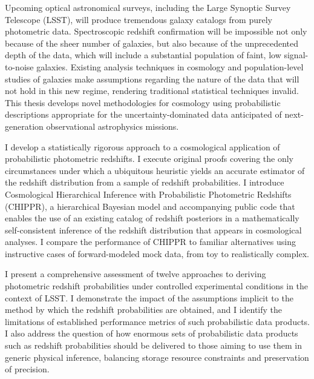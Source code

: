Upcoming optical astronomical surveys, including the Large Synoptic Survey Telescope (LSST), will produce tremendous galaxy catalogs from purely photometric data.
Spectroscopic redshift confirmation will be impossible not only because of the sheer number of galaxies, but also because of the unprecedented depth of the data, which will include a substantial population of faint, low signal-to-noise galaxies.
Existing analysis techniques in cosmology and population-level studies of galaxies make assumptions regarding the nature of the data that will not hold in this new regime, rendering traditional statistical techniques invalid.
This thesis develops novel methodologies for cosmology using probabilistic descriptions appropriate for the uncertainty-dominated data anticipated of next-generation observational astrophysics missions. 

I develop a statistically rigorous approach to a cosmological application of probabilistic photometric redshifts.
I execute original proofs covering the only circumstances under which a ubiquitous heuristic yields an accurate estimator of the redshift distribution from a sample of redshift probabilities.
I introduce Cosmological Hierarchical Inference with Probabilistic Photometric Redshifts (CHIPPR), a hierarchical Bayesian model and accompanying public code that enables the use of an existing catalog of redshift posteriors in a mathematically self-consistent inference of the redshift distribution that appears in cosmological analyses.
I compare the performance of CHIPPR to familiar alternatives using instructive cases of forward-modeled mock data, from toy to realistically complex.

I present a comprehensive assessment of twelve approaches to deriving photometric redshift probabilities under controlled experimental conditions in the context of LSST.
I demonstrate the impact of the assumptions implicit to the method by which the redshift probabilities are obtained, and I identify the limitations of established performance metrics of such probabilistic data products.
I also address the question of how enormous sets of probabilistic data products such as redshift probabilities should be delivered to those aiming to use them in generic physical inference, balancing storage resource constraints and preservation of precision.


